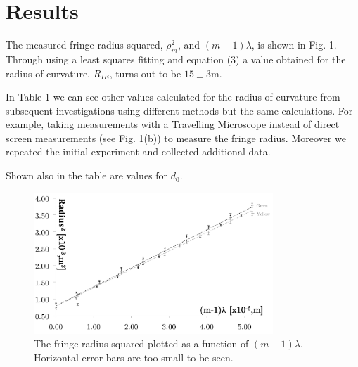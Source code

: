 \documentclass[twocolumn]{revtex4}
\newcommand{\squeezeup}{\vspace{-2.5mm}}
\begin{document}
\vspace{-3ex}
\section{Results}
\vspace{-2ex}

The measured fringe radius squared, $\rho_m^2$, and $(m-1)\lambda$, is shown in Fig. 1. Through using a least squares fitting and equation (3) a value obtained for the radius of curvature, $R_{IE}$, turns out to be $15\pm3$m. 

In Table 1 we can see other values calculated for the radius of curvature from subsequent investigations using different methods but the same calculations. For example, taking measurements with a Travelling Microscope instead of direct screen measurements (see Fig. 1(b)) to measure the fringe radius. Moreover we repeated the initial experiment and collected additional data.  

Shown also in the table are values for $d_0$. 
\vspace{-1ex}
\begin{figure}[!h]
\begin{center}
\includegraphics[width=9cm]{fig2}
\caption[]{The fringe radius squared plotted as a function of $(m-1)\lambda$. Horizontal error bars are too small to be seen.}
\label{fig:fig2}
\end{center}
\end{figure}

\squeezeup
\squeezeup
\squeezeup
\end{document}
